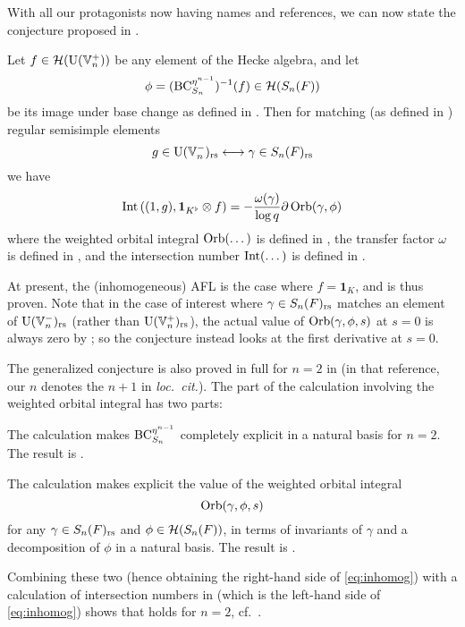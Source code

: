 With all our protagonists now having names and references,
we can now state the conjecture proposed in \cite{ref:AFLspherical}.

\begin{conjecture}
  \label{conj:inhomog_spherical}
  Let $f \in \mathcal H(\operatorname{U}(\mathbb V_n^+))$ be any element of the Hecke algebra, and let
  \[ \phi = (\operatorname{BC}_{S_n}^{\eta^{n-1}})^{-1}(f) \in \mathcal H(S_n(F)) \]
  be its image under base change as defined in .
  Then for matching (as defined in ) regular semisimple elements
  \[ g \in \operatorname{U}(\mathbb V_n^-)_{\mathrm{rs}} \longleftrightarrow \gamma \in S_n(F)_{\mathrm{rs}} \]
  we have
  \begin{equation}
    \operatorname{Int}\left( (1,g), \mathbf{1}_{K^\flat} \otimes f \right)
    = -\frac{\omega(\gamma)}{\log q} \partial \operatorname{Orb}(\gamma, \phi)
    \label{eq:inhomog}
  \end{equation}
  where the weighted orbital integral $\operatorname{Orb}(\dots)$ is defined in ,
  the transfer factor $\omega$ is defined in ,
  and the intersection number $\operatorname{Int}(\dots)$ is defined in .
\end{conjecture}

At present, the (inhomogeneous) AFL is the case where $f = \mathbf{1}_K$,
and is thus proven.
Note that in the case of interest where $\gamma \in S_n(F)_{\mathrm{rs}}$
matches an element of $\operatorname{U}(\mathbb V_n^-)_{\mathrm{rs}}$ (rather than $\operatorname{U}(\mathbb V_n^+)_{\mathrm{rs}}$),
the actual value of $\operatorname{Orb}(\gamma, \phi, s)$ at $s = 0$ is always zero
by ;
so the conjecture instead looks at the first derivative at $s = 0$.

The generalized conjecture is also proved in full for
$n = 2$ in \cite[Theorem 1.0.1]{ref:AFLspherical}
(in that reference, our $n$ denotes the $n+1$ in \emph{loc.\ cit.}).
The part of the calculation involving the weighted orbital integral has two parts:
\begin{itemize}
  \ii The calculation makes $\operatorname{BC}_{S_{n}}^{\eta^{n-1}}$
  completely explicit in a natural basis for $n = 2$.
  The result is \cite[Lemma 7.1.1]{ref:AFLspherical}.

  \ii The calculation makes explicit the value of the weighted orbital integral
  \[ \operatorname{Orb}(\gamma, \phi, s) \]
  for any $\gamma \in S_n(F)_{\mathrm{rs}}$ and $\phi \in \mathcal H(S_n(F))$,
  in terms of invariants of $\gamma$ and a decomposition of $\phi$ in a natural basis.
  The result is \cite[Proposition 7.3.2]{ref:AFLspherical}.
\end{itemize}
Combining these two (hence obtaining the right-hand side of \eqref{eq:inhomog})
with a calculation of intersection numbers in \cite[Corollary 7.4.3]{ref:AFLspherical}
(which is the left-hand side of \eqref{eq:inhomog})
shows that  holds for $n = 2$,
cf.\ \cite[Theorem 7.5.1]{ref:AFLspherical}.


